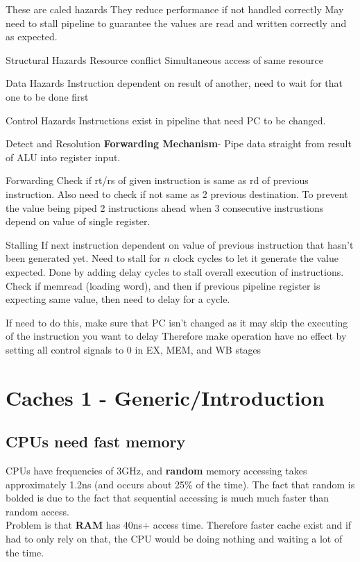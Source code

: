 \documentclass{article}
\begin{document}
		These are caled hazards
		They reduce performance if not handled correctly
		May need to stall pipeline to guarantee the values are read and written correctly and as expected.


		Structural Hazards
			Resource conflict
			Simultaneous access of same resource

		Data Hazards
			Instruction dependent on result of another, need to wait for that one to be done first

		Control Hazards
			Instructions exist in pipeline that need PC to be changed.

		Detect and Resolution
			\textbf{Forwarding Mechanism}- Pipe data straight from result of ALU into register input.

			Forwarding
				Check if rt/rs of given instruction is same as rd of previous instruction.
				Also need to check if not same as 2 previous destination. To prevent the value being piped 2 instructions ahead when 3 consecutive instrustions depend on value of single register.

			Stalling
				If next instruction dependent on value of previous instruction that hasn't been generated yet. 
				Need to stall for $n$ clock cycles to let it generate the value expected. 
				Done by adding delay cycles to stall overall execution of instructions.
				Check if memread (loading word), and then if previous pipeline register is expecting same value, then need to delay for a cycle.

				If need to do this, make sure that PC isn't changed as it may skip the executing of the instruction you want to delay
				Therefore make operation have no effect by setting all control signals to 0 in EX, MEM, and WB stages

				

\section*{Caches 1 - Generic/Introduction}
	\subsection*{CPUs need fast memory}
		CPUs have frequencies of 3GHz, and \textbf{random} memory accessing takes approximately 1.2ns (and occurs about 25\% of the time). The fact that random is bolded is due to the fact that sequential accessing is much much faster than random access.\\

		Problem is that \textbf{RAM} has 40ns+ access time. Therefore faster cache exist and if had to only rely on that, the CPU would be doing nothing and waiting a lot of the time.\\
\end{document}
